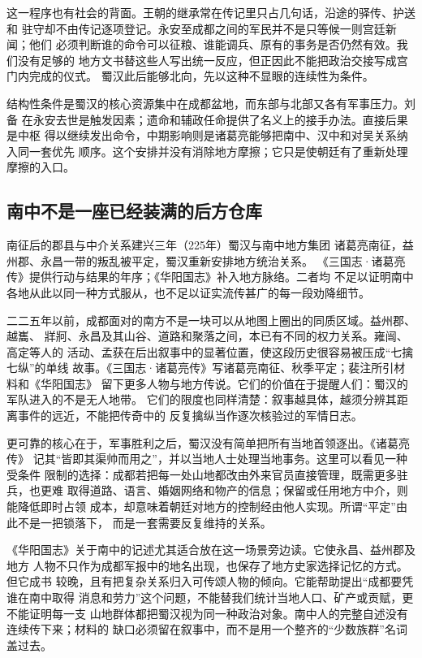 这一程序也有社会的背面。王朝的继承常在传记里只占几句话，沿途的驿传、护送和
驻守却不由传记逐项登记。永安至成都之间的军民并不是只等候一则宫廷新闻；他们
必须判断谁的命令可以征粮、谁能调兵、原有的事务是否仍然有效。我们没有足够的
地方文书替这些人写出统一反应，但正因此不能把政治交接写成宫门内完成的仪式。
蜀汉此后能够北向，先以这种不显眼的连续性为条件。

\begin{causalchain}
结构性条件是蜀汉的核心资源集中在成都盆地，而东部与北部又各有军事压力。刘备
在永安去世是触发因素；遗命和辅政任命提供了名义上的接手办法。直接后果是中枢
得以继续发出命令，中期影响则是诸葛亮能够把南中、汉中和对吴关系纳入同一套优先
顺序。这个安排并没有消除地方摩擦；它只是使朝廷有了重新处理摩擦的入口。
\end{causalchain}

\subsection{南中不是一座已经装满的后方仓库}

\begin{event}{南征后的郡县与中介关系}{建兴三年（225年）}{蜀汉与南中地方集团}{}
诸葛亮南征，益州郡、永昌一带的叛乱被平定，蜀汉重新安排地方统治关系。
《三国志·诸葛亮传》提供行动与结果的年序；《华阳国志》补入地方脉络。二者均
不足以证明南中各地从此以同一种方式服从，也不足以证实流传甚广的每一段劝降细节。
\end{event}

二二五年以前，成都面对的南方不是一块可以从地图上圈出的同质区域。益州郡、越巂、
牂牁、永昌及其山谷、道路和聚落之间，本已有不同的权力关系。雍闿、高定等人的
活动、孟获在后出叙事中的显著位置，使这段历史很容易被压成“七擒七纵”的单线
故事。《三国志·诸葛亮传》写诸葛亮南征、秋季平定；裴注所引材料和《华阳国志》
留下更多人物与地方传说。它们的价值在于提醒人们：蜀汉的军队进入的不是无人地带。
它们的限度也同样清楚：叙事越具体，越须分辨其距离事件的远近，不能把传奇中的
反复擒纵当作逐次核验过的军情日志。

更可靠的核心在于，军事胜利之后，蜀汉没有简单把所有当地首领逐出。《诸葛亮传》
记其“皆即其渠帅而用之”，并以当地人士处理当地事务。这里可以看见一种受条件
限制的选择：成都若把每一处山地都改由外来官员直接管理，既需更多驻兵，也更难
取得道路、语言、婚姻网络和物产的信息；保留或任用地方中介，则能降低即时占领
成本，却意味着朝廷对地方的控制经由他人实现。所谓“平定”由此不是一把锁落下，
而是一套需要反复维持的关系。

《华阳国志》关于南中的记述尤其适合放在这一场景旁边读。它使永昌、益州郡及地方
人物不只作为成都军报中的地名出现，也保存了地方史家选择记忆的方式。但它成书
较晚，且有把复杂关系归入可传颂人物的倾向。它能帮助提出“成都要凭谁在南中取得
消息和劳力”这个问题，不能替我们统计当地人口、矿产或贡赋，更不能证明每一支
山地群体都把蜀汉视为同一种政治对象。南中人的完整自述没有连续传下来；材料的
缺口必须留在叙事中，而不是用一个整齐的“少数族群”名词盖过去。

